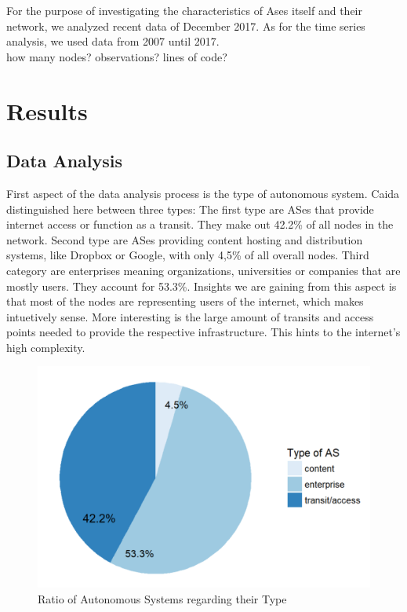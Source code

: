 \documentclass[conference, 11pt]{IEEEtran}
\begin{document}
For the purpose of investigating the characteristics of Ases itself and their network, we analyzed recent data of December 2017.  As for the time series analysis, we used data from 2007 until 2017. \\

how many nodes? observations? lines of code?

\section{Results}

\subsection{Data Analysis}
First aspect of the data analysis process is the type of autonomous system. Caida distinguished here between three types: The first type are ASes that provide internet access or function as a transit. They make out 42.2\% of all nodes in the network. Second type are ASes providing content hosting and distribution systems, like Dropbox or Google, with only 4,5\% of all overall nodes. Third category are enterprises meaning organizations, universities or companies that are mostly users. They account for 53.3\%. Insights we are gaining from this aspect is that most of the nodes are representing users of the internet, which makes intuetively sense. More interesting is the large amount of transits and access points needed to provide the respective infrastructure. This hints to the internet's high complexity. 


\begin{figure}[htbp]
\centerline{\includegraphics[scale=0.4]{Graphics/typeofAS.PNG}}
\caption{Ratio of Autonomous Systems regarding their Type }
\label{fig}
\end{figure}
\end{document}
